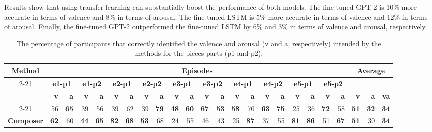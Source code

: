 Results show that using transfer learning can substantially boost the performance
of both models. The fine-tuned GPT-2 is 10\% more accurate in terms of valence and 8\% in terms of arousal. The fine-tuned LSTM is 5\% more accurate in terms of
valence and 12\% in terms of arousal. Finally, the fine-tuned GPT-2
outperformed the fine-tuned LSTM by 6\% and 3\% in terms of valence and arousal, respectively. %

\begin{table*}[!t]
\centering
\setlength{\tabcolsep}{4pt}
\begin{tabular}{crrrrrrrrrrrrrrrrrrrrrrr}
\toprule
\multirow{3}{*}{\textbf{Method}} & \multicolumn{20}{c}{\textbf{Episodes}} & \multicolumn{3}{c}{\multirow{3}{*}{\textbf{Average}}} \\
\cmidrule{2-21}
& \multicolumn{2}{c}{\textbf{e1-p1}} & \multicolumn{2}{c}{\textbf{e1-p2}} & \multicolumn{2}{c}{\textbf{e2-p1}} & \multicolumn{2}{c}{\textbf{e2-p2}} & \multicolumn{2}{c}{\textbf{e3-p1}} & \multicolumn{2}{c}{\textbf{e3-p2}} & \multicolumn{2}{c}{\textbf{e4-p1}} & \multicolumn{2}{c}{\textbf{e4-p2}} & \multicolumn{2}{c}{\textbf{e5-p1}} & \multicolumn{2}{c}{\textbf{e5-p2}} \\
& \textbf{v} & \textbf{a} & \textbf{v} & \textbf{a} & \textbf{v} & \textbf{a} & \textbf{v} & \textbf{a} & \textbf{v} & \textbf{a} & \textbf{v} & \textbf{a} & \textbf{v} & \textbf{a} & \textbf{v} & \textbf{a} & \textbf{v} & \textbf{a} & \textbf{v} & \textbf{a} & \textbf{v} & \textbf{a} & \textbf{va}\\
\cmidrule{2-21}
\multicolumn{1}{l}{\textbf{Baseline}} & 56 & \textbf{65} & 39 & 56 & 39 & 62 & 39 & \textbf{79} & \textbf{48} & \textbf{60} & \textbf{67} & \textbf{53} & \textbf{58} & 70 & \textbf{63} & \textbf{75} & 25 & 36 & \textbf{72} & 58 & \textbf{51} & \textbf{32} & \textbf{34}\\
\multicolumn{1}{l}{\textbf{Composer}} & \textbf{62} & 60 & \textbf{44} & \textbf{65} & \textbf{82} & \textbf{68} & \textbf{53} & 68 & 24 & 55 & 46 & 43 & 25 & \textbf{87} & 37 & 55 & \textbf{81} & \textbf{86} & 51 & \textbf{67} & \textbf{51} & 30 & \textbf{34}\\
\bottomrule
\end{tabular}
\caption{The percentage of participants  that  correctly  identified  the valence and arousal (v and a, respectively) intended by the methods for the pieces parts (p1 and p2).
}
\label{tab:user_study}
\end{table*}

